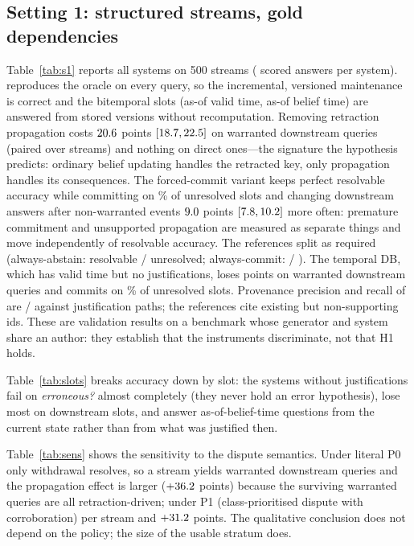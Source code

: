 \subsection{Setting 1: structured streams, gold dependencies}

Table~\ref{tab:s1} reports all systems on 500 streams (\sOneAnswers{} scored answers per system). \pal{} reproduces the oracle on every query, so the incremental, versioned maintenance is correct and the bitemporal slots (as-of valid time, as-of belief time) are answered from stored versions without recomputation. Removing retraction propagation costs $20.6$ points $[18.7, 22.5]$ on warranted downstream queries (paired over \sOnePropN{} streams) and nothing on direct ones---the signature the hypothesis predicts: ordinary belief updating handles the retracted key, only propagation handles its consequences. The forced-commit variant keeps perfect resolvable accuracy while committing on \sOneCommitRate\% of unresolved slots and changing downstream answers after non-warranted events $9.0$ points $[7.8, 10.2]$ more often: premature commitment and unsupported propagation are measured as separate things and move independently of resolvable accuracy. The references split as required (always-abstain: \sOneAbstainRes{} resolvable / \sOneAbstainUnres{} unresolved; always-commit: \sOneCommitRes{} / \sOneCommitUnres{}). The temporal DB, which has valid time but no justifications, loses \sOneTdbWarr{} points on warranted downstream queries and commits on \sOneTdbCommit\% of unresolved slots. Provenance precision and recall of \pal{} are \sOneProvP/\sOneProvR{} against justification paths; the references cite existing but non-supporting ids. These are validation results on a benchmark whose generator and system share an author: they establish that the instruments discriminate, not that H1 holds.


Table~\ref{tab:slots} breaks accuracy down by slot: the systems without justifications fail on \emph{erroneous?} almost completely (they never hold an error hypothesis), lose most on downstream slots, and answer as-of-belief-time questions from the current state rather than from what was justified then.


Table~\ref{tab:sens} shows the sensitivity to the dispute semantics. Under literal P0 only withdrawal resolves, so a stream yields \sOneLitPZeroWarr{} warranted downstream queries and the propagation effect is larger ($+36.2$ points) because the surviving warranted queries are all retraction-driven; under P1 (class-prioritised dispute with corroboration) \sOnePOneWarr{} per stream and $+31.2$ points. The qualitative conclusion does not depend on the policy; the size of the usable stratum does.

